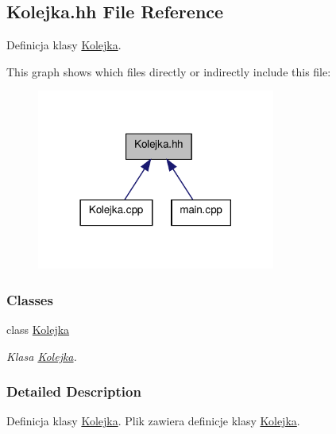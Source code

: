 \hypertarget{a00008}{\subsection{Kolejka.\-hh File Reference}
\label{a00008}
}


Definicja klasy \hyperlink{a00002}{Kolejka}.  


This graph shows which files directly or indirectly include this file\-:\nopagebreak
\begin{figure}[H]
\begin{center}
\leavevmode
\includegraphics[width=222pt]{a00019}
\end{center}
\end{figure}
\subsubsection*{Classes}
\begin{DoxyCompactItemize}
\item 
class \hyperlink{a00002}{Kolejka}
\begin{DoxyCompactList}\small\item\em Klasa \hyperlink{a00002}{Kolejka}. \end{DoxyCompactList}\end{DoxyCompactItemize}


\subsubsection{Detailed Description}
Definicja klasy \hyperlink{a00002}{Kolejka}. Plik zawiera definicje klasy \hyperlink{a00002}{Kolejka}. 